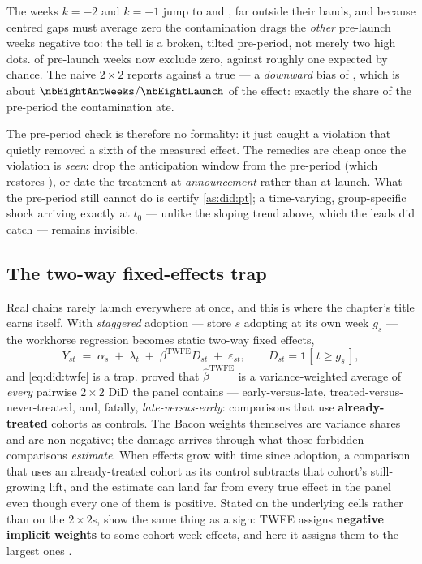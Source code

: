 The weeks $k = -2$ and $k = -1$ jump to \eur{\nbEightAntLeadMinusTwo} and
\eur{\nbEightAntLeadMinusOne}, far outside their bands, and because centred gaps must average zero
the contamination drags the \emph{other} pre-launch weeks negative too: the tell is a broken, tilted
pre-period, not merely two high dots. \nbEightAntLeadsOut{} of \nbEightAntNPre{} pre-launch weeks now
exclude zero, against roughly one expected by chance. The naive $2 \times 2$ reports
\eur{\nbEightAntDid} against a true \eur{\nbEightTrueEffect} --- a \emph{downward} bias of
\eur{\nbEightAntBiasAbs}, which is about $\nbEightAntWeeks/\nbEightLaunch$ of the effect: exactly the
share of the pre-period the contamination ate.

The pre-period check is therefore no formality: it just caught a violation that quietly removed a
sixth of the measured effect. The remedies are cheap once the violation is \emph{seen}: drop the
anticipation window from the pre-period (which restores \eur{\nbEightAntFixed}), or date the
treatment at \emph{announcement} rather than at launch. What the pre-period still cannot do is
certify \cref{as:did:pt}; a time-varying, group-specific shock arriving exactly at $t_0$ --- unlike
the sloping trend above, which the leads did catch --- remains invisible.

\subsection*{The two-way fixed-effects trap}

Real chains rarely launch everywhere at once, and this is where the chapter's title earns itself.
With \emph{staggered} adoption --- store $s$ adopting at its own week $g_s$ --- the workhorse
regression becomes static two-way fixed effects,
%
\begin{equation}
  Y_{st} \;=\; \alpha_s \;+\; \lambda_t \;+\; \beta^{\text{TWFE}} D_{st} \;+\; \varepsilon_{st},
  \qquad D_{st} = \mathbf 1[\,t \ge g_s\,],
  \label{eq:did:twfe}
\end{equation}
%
and \cref{eq:did:twfe} is a trap.  proved that
$\hat\beta^{\text{TWFE}}$ is a variance-weighted average of \emph{every} pairwise $2 \times 2$ DiD
the panel contains --- early-versus-late, treated-versus-never-treated, and, fatally,
\emph{late-versus-early}: comparisons that use \textbf{already-treated} cohorts as controls. The
Bacon weights themselves are variance shares and are non-negative; the damage arrives through what
those forbidden comparisons \emph{estimate}. When effects grow with time since adoption, a
comparison that uses an already-treated cohort as its control subtracts that cohort's still-growing
lift, and the estimate can land far from every true effect in the panel even though every one of them
is positive. Stated on the underlying cells rather than on the $2 \times 2$s,
\citet{dechaisemartin2020} show the same thing as a sign: TWFE assigns \textbf{negative implicit
weights} to some cohort-week effects, and here it assigns them to the largest ones
\citep{sunabraham2021}.

